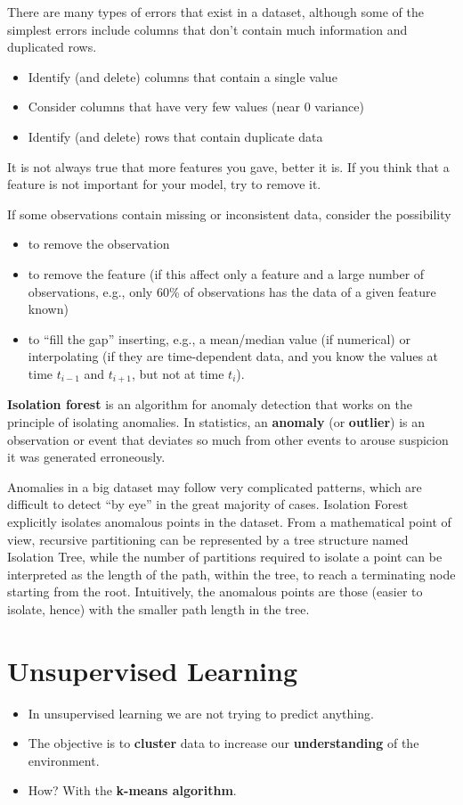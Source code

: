There are many types of errors that exist in a dataset, although some of the simplest errors include columns that don’t contain much information and duplicated rows.
\begin{itemize}
    \item Identify (and delete) columns that contain a single value
    \item Consider columns that have very few values (near $0$ variance)
    \item Identify (and delete) rows that contain duplicate data
\end{itemize}

It is not always true that more features you gave, better it is. If you think that a feature is not important for your model, try to remove it.

If some observations contain missing or inconsistent data, consider the possibility
\begin{itemize}
    \item to remove the observation
    \item to remove the feature (if this affect only a feature and a large number of observations, e.g., only 60\% of observations has the data of a given feature known)
    \item to “fill the gap” inserting, e.g., a mean/median value (if numerical) or interpolating (if they are time-dependent data, and you know the values at time $t_{i-1}$ and $t_{i+1}$, but not at time $t_{i}$).
\end{itemize}

\textbf{Isolation forest} is an algorithm for anomaly detection that works on the principle of isolating anomalies. In statistics, an \textbf{anomaly} (or \textbf{outlier}) is an observation or event that deviates so much from other events to arouse suspicion it was generated erroneously.

Anomalies in a big dataset may follow very complicated patterns, which are difficult to detect “by eye” in the great majority of cases. Isolation Forest explicitly isolates anomalous points in the dataset. From a mathematical point of view, recursive partitioning can be represented by a tree structure named Isolation Tree, while the number of partitions required to isolate a point can be interpreted as the length of the path, within the tree, to reach a terminating node starting from the root. Intuitively, the anomalous points are those (easier to isolate, hence) with the smaller path length in the tree.
\section{Unsupervised Learning}
\begin{itemize}
    \item In unsupervised learning we are not trying to predict anything.
    \item The objective is to \textbf{cluster} data to increase our \textbf{understanding} of the environment.
    \item How? With the \textbf{k-means algorithm}.
\end{itemize}

